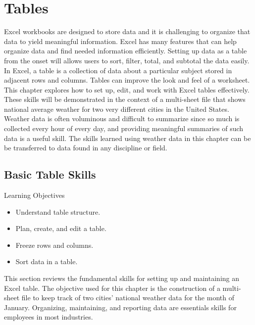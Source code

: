 \chapter{Tables}\label{ch05:tables}

Excel workbooks are designed to store data and it is challenging to organize that data to yield meaningful information. Excel has many features that can help organize data and find needed information efficiently. Setting up data as a table from the onset will allows users to sort, filter, total, and subtotal the data easily. In Excel, a table is a collection of data about a particular subject stored in adjacent rows and columns. Tables can improve the look and feel of a worksheet. This chapter explores how to set up, edit, and work with Excel tables effectively. These skills will be demonstrated in the context of a multi-sheet file that shows national average weather for two very different cities in the United States. Weather data is often voluminous and difficult to summarize since so much is collected every hour of every day, and providing meaningful summaries of such data is a useful skill. The skills learned using weather data in this chapter can be be transferred to data found in any discipline or field.

\section{Basic Table Skills}

\begin{center}
	\begin{objbox}{Learning Objectives}
		\begin{itemize}
			\setlength{\itemsep}{0pt}
			\setlength{\parskip}{0pt}
			\setlength{\parsep}{0pt}
			
			\item Understand table structure.
			\item Plan, create, and edit a table.
			\item Freeze rows and columns.
			\item Sort data in a table.
		\end{itemize}
	\end{objbox}
\end{center}

This section reviews the fundamental skills for setting up and maintaining an Excel table. The objective used for this chapter is the construction of a multi-sheet file to keep track of two cities' national weather data for the month of January. Organizing, maintaining, and reporting data are essentials skills for employees in most industries.

